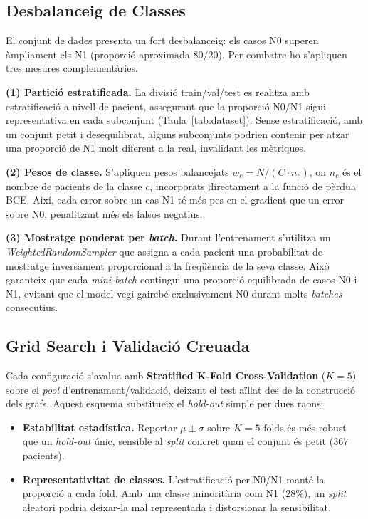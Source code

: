 \documentclass[10pt,a4paper,twocolumn,twoside]{article}
\begin{document}
\subsection{Desbalanceig de Classes}

El conjunt de dades presenta un fort desbalanceig: els casos N0 superen àmpliament els N1 (proporció aproximada
80/20). Per combatre-ho s'apliquen tres mesures complementàries.

\textbf{(1) Partició estratificada.} La divisió train/val/test es realitza amb estratificació a
nivell de pacient, assegurant que la proporció N0/N1 sigui representativa en cada subconjunt
(Taula~\ref{tab:dataset}). Sense estratificació, amb un conjunt petit i desequilibrat, alguns
subconjunts podrien contenir per atzar una proporció de N1 molt diferent a la real, invalidant les
mètriques.

\textbf{(2) Pesos de classe.} S'apliquen pesos balancejats $w_c = N / (C \cdot n_c)$, on $n_c$ és el
nombre de pacients de la classe $c$, incorporats directament a la funció de pèrdua BCE. Així, cada error
sobre un cas N1 té més pes en el gradient que un error sobre N0, penalitzant més els falsos negatius.

\textbf{(3) Mostratge ponderat per \textit{batch}.} Durant l'entrenament s'utilitza un
\textit{WeightedRandomSampler} que assigna a cada pacient una probabilitat de mostratge inversament
proporcional a la freqüència de la seva classe. Això garanteix que cada \textit{mini-batch} contingui una
proporció equilibrada de casos N0 i N1, evitant que el model vegi gairebé exclusivament N0 durant molts
\textit{batches} consecutius.

\subsection{Grid Search i Validació Creuada}
\label{sec:gridsearch}

Cada configuració s'avalua amb \textbf{Stratified K-Fold Cross-Validation} ($K = 5$) sobre
el \textit{pool} d'entrenament/validació, deixant el test aïllat des de la construcció dels
grafs. Aquest esquema substitueix el \textit{hold-out} simple per dues raons:

\begin{itemize}
    \item \textbf{Estabilitat estadística.} Reportar $\mu \pm \sigma$ sobre $K\!=\!5$ folds és
    més robust que un \textit{hold-out} únic, sensible al \textit{split} concret quan el
    conjunt és petit (367 pacients).
    \item \textbf{Representativitat de classes.} L'estratificació per N0/N1 manté la
    proporció a cada fold. Amb una classe minoritària com N1 ($28\%$), un \textit{split}
    aleatori podria deixar-la mal representada i distorsionar la sensibilitat.
\end{itemize}
\end{document}
